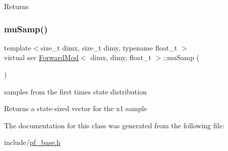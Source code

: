 \begin{DoxyReturn}{Returns}

\end{DoxyReturn}
\mbox{\label{classForwardMod_aa768950ea619560a820905eb71eed82c}} 
\subsubsection{\texorpdfstring{mu\+Samp()}{muSamp()}}
{\footnotesize\ttfamily template$<$size\+\_\+t dimx, size\+\_\+t dimy, typename float\+\_\+t $>$ \\
virtual ssv \hyperlink{classForwardMod}{Forward\+Mod}$<$ dimx, dimy, float\+\_\+t $>$\+::mu\+Samp (\begin{DoxyParamCaption}{ }\end{DoxyParamCaption})\hspace{0.3cm}{\ttfamily [pure virtual]}}



samples from the first time\textquotesingle{}s state distribution 

\begin{DoxyReturn}{Returns}
a state-\/sized vector for the x1 sample 
\end{DoxyReturn}


The documentation for this class was generated from the following file\+:\begin{DoxyCompactItemize}
\item 
include/\hyperlink{pf__base_8h}{pf\+\_\+base.\+h}\end{DoxyCompactItemize}
